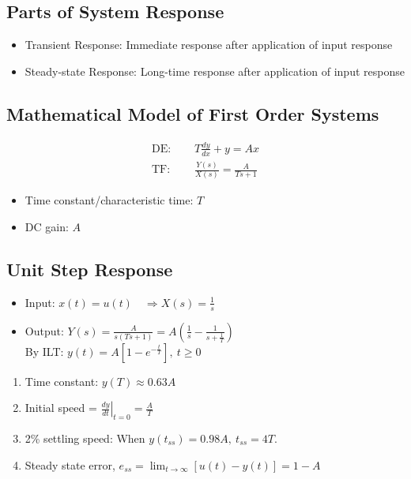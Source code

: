 \documentclass[a4paper]{article}
\begin{document}
\subsection{Parts of System Response}
\begin{itemize}
    \item Transient Response: Immediate response after application of input response
    \item Steady-state Response: Long-time response after application of input response
\end{itemize}
\subsection{Mathematical Model of First Order Systems}
\begin{align*}
    \text{DE: }&\quad T\frac{dy}{dx}+y=Ax\\
    \text{TF: }&\quad \frac{Y(s)}{X(s)} = \frac{A}{Ts+1}
\end{align*}
\begin{itemize}
    \item Time constant/characteristic time: $T$
    \item DC gain: $A$
\end{itemize}
\newpage
\subsection{Unit Step Response}
\begin{itemize}
    \item Input: $x(t) = u(t)\quad \Rightarrow X(s) = \displaystyle\frac{1}{s}$
    \item Output: $Y(s) = \displaystyle\frac{A}{s(Ts+1)} = A\left(\frac{1}{s}-\frac{1}{s+\frac{1}{T}}\right)$\\
    By ILT: $y(t) = A\left[1-e^{-\frac{t}{T}}\right],\ t\geq 0$
\end{itemize}
\begin{enumerate}
    \item Time constant: $y(T) \approx 0.63A$
    \item Initial speed = $\displaystyle\left.\frac{dy}{dt}\right|_{t = 0} = \frac{A}{T}$
    \item 2\% settling speed: When $y(t_{ss}) = 0.98A,\ t_{ss} = 4T$.
    \item Steady state error, $e_{ss} = \displaystyle\lim_{t\to\infty}\left[u(t)-y(t)\right] = 1-A$
\end{enumerate}
\end{document}
